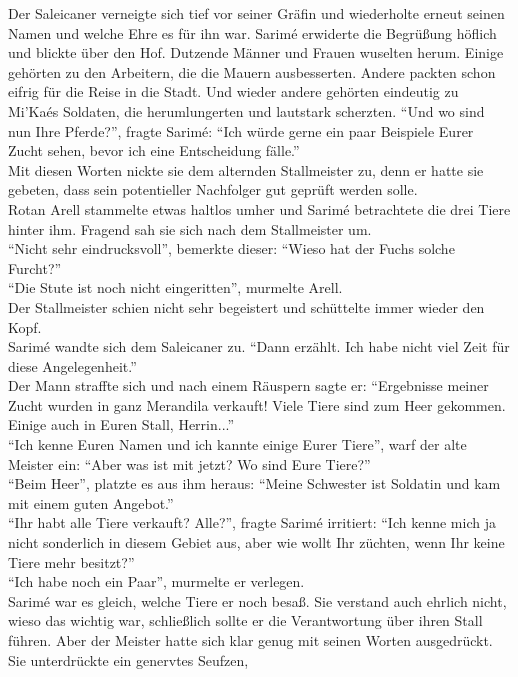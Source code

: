 Der Saleicaner verneigte sich tief vor seiner Gräfin und wiederholte erneut seinen Namen und welche 
Ehre es für ihn war. Sarimé erwiderte die Begrüßung höflich und blickte über den Hof. Dutzende 
Männer und Frauen wuselten herum. Einige gehörten zu den Arbeitern, die die Mauern ausbesserten. 
Andere packten schon eifrig für die Reise in die Stadt. Und wieder andere gehörten eindeutig zu 
Mi'Kaés Soldaten, die herumlungerten und lautstark scherzten. ``Und wo sind nun Ihre Pferde?'', 
fragte Sarimé: ``Ich würde gerne ein paar Beispiele Eurer Zucht sehen, bevor ich eine Entscheidung 
fälle.''\\
Mit diesen Worten nickte sie dem alternden Stallmeister zu, denn er hatte sie gebeten, dass sein 
potentieller Nachfolger gut geprüft werden solle.\\
Rotan Arell stammelte etwas haltlos umher und Sarimé betrachtete die drei Tiere hinter ihm. Fragend 
sah sie sich nach dem Stallmeister um.\\
``Nicht sehr eindrucksvoll'', bemerkte dieser: ``Wieso hat der Fuchs solche Furcht?''\\
``Die Stute ist noch nicht eingeritten'', murmelte Arell.\\
Der Stallmeister schien nicht sehr begeistert und schüttelte immer wieder den Kopf.\\
Sarimé wandte sich dem Saleicaner zu. ``Dann erzählt. Ich habe nicht viel Zeit für diese 
Angelegenheit.''\\
Der Mann straffte sich und nach einem Räuspern sagte er: ``Ergebnisse meiner Zucht wurden in ganz 
Merandila verkauft! Viele Tiere sind zum Heer gekommen. Einige auch in Euren Stall, Herrin...''\\
``Ich kenne Euren Namen und ich kannte einige Eurer Tiere'', warf der alte Meister ein: ``Aber was 
ist mit jetzt? Wo sind Eure Tiere?''\\
``Beim Heer'', platzte es aus ihm heraus: ``Meine Schwester ist Soldatin und kam mit einem guten 
Angebot.''\\
``Ihr habt alle Tiere verkauft? Alle?'', fragte Sarimé irritiert: ``Ich kenne mich ja nicht 
sonderlich in diesem Gebiet aus, aber wie wollt Ihr züchten, wenn Ihr keine Tiere mehr besitzt?''\\
``Ich habe noch ein Paar'', murmelte er verlegen.\\
Sarimé war es gleich, welche Tiere er noch besaß. Sie verstand auch ehrlich nicht, wieso das 
wichtig war, schließlich sollte er die Verantwortung über ihren Stall führen. Aber der Meister 
hatte sich klar genug mit seinen Worten ausgedrückt. Sie unterdrückte ein genervtes Seufzen, 
